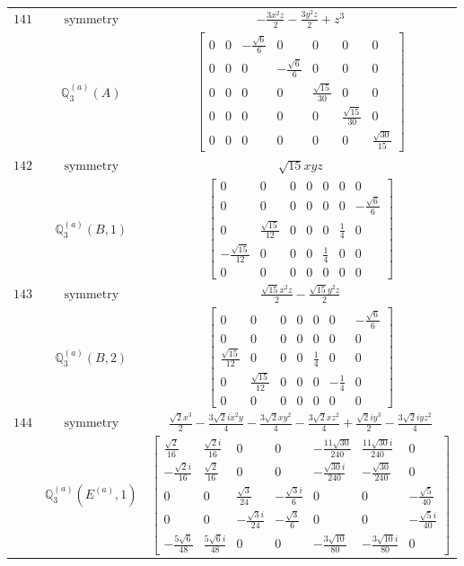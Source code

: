 \documentclass[fleqn,8pt,landscape]{jsarticle}
\begin{document}
\begin{longtable}{ccc}
$ 141 $ & $ \text{symmetry} $ & $ - \frac{3 x^{2} z}{2} - \frac{3 y^{2} z}{2} + z^{3} $ \\
$  $ & $ \mathbb{Q}_{3}^{(a)}(A) $ & $ \begin{bmatrix} 0 & 0 & - \frac{\sqrt{6}}{6} & 0 & 0 & 0 & 0 \\ 0 & 0 & 0 & - \frac{\sqrt{6}}{6} & 0 & 0 & 0 \\ 0 & 0 & 0 & 0 & \frac{\sqrt{15}}{30} & 0 & 0 \\ 0 & 0 & 0 & 0 & 0 & \frac{\sqrt{15}}{30} & 0 \\ 0 & 0 & 0 & 0 & 0 & 0 & \frac{\sqrt{30}}{15} \end{bmatrix} $ \\ \hline
$ 142 $ & $ \text{symmetry} $ & $ \sqrt{15} x y z $ \\
$  $ & $ \mathbb{Q}_{3}^{(a)}(B,1) $ & $ \begin{bmatrix} 0 & 0 & 0 & 0 & 0 & 0 & 0 \\ 0 & 0 & 0 & 0 & 0 & 0 & - \frac{\sqrt{6}}{6} \\ 0 & \frac{\sqrt{15}}{12} & 0 & 0 & 0 & \frac{1}{4} & 0 \\ - \frac{\sqrt{15}}{12} & 0 & 0 & 0 & \frac{1}{4} & 0 & 0 \\ 0 & 0 & 0 & 0 & 0 & 0 & 0 \end{bmatrix} $ \\ \hline
$ 143 $ & $ \text{symmetry} $ & $ \frac{\sqrt{15} x^{2} z}{2} - \frac{\sqrt{15} y^{2} z}{2} $ \\
$  $ & $ \mathbb{Q}_{3}^{(a)}(B,2) $ & $ \begin{bmatrix} 0 & 0 & 0 & 0 & 0 & 0 & - \frac{\sqrt{6}}{6} \\ 0 & 0 & 0 & 0 & 0 & 0 & 0 \\ \frac{\sqrt{15}}{12} & 0 & 0 & 0 & \frac{1}{4} & 0 & 0 \\ 0 & \frac{\sqrt{15}}{12} & 0 & 0 & 0 & - \frac{1}{4} & 0 \\ 0 & 0 & 0 & 0 & 0 & 0 & 0 \end{bmatrix} $ \\ \hline
$ 144 $ & $ \text{symmetry} $ & $ \frac{\sqrt{2} x^{3}}{2} - \frac{3 \sqrt{2} i x^{2} y}{4} - \frac{3 \sqrt{2} x y^{2}}{4} - \frac{3 \sqrt{2} x z^{2}}{4} + \frac{\sqrt{2} i y^{3}}{2} - \frac{3 \sqrt{2} i y z^{2}}{4} $ \\
$  $ & $ \mathbb{Q}_{3}^{(a)}(E^{(a)},1) $ & $ \begin{bmatrix} \frac{\sqrt{2}}{16} & \frac{\sqrt{2} i}{16} & 0 & 0 & - \frac{11 \sqrt{30}}{240} & \frac{11 \sqrt{30} i}{240} & 0 \\ - \frac{\sqrt{2} i}{16} & \frac{\sqrt{2}}{16} & 0 & 0 & - \frac{\sqrt{30} i}{240} & - \frac{\sqrt{30}}{240} & 0 \\ 0 & 0 & \frac{\sqrt{3}}{24} & - \frac{\sqrt{3} i}{6} & 0 & 0 & - \frac{\sqrt{5}}{40} \\ 0 & 0 & - \frac{\sqrt{3} i}{24} & - \frac{\sqrt{3}}{6} & 0 & 0 & - \frac{\sqrt{5} i}{40} \\ - \frac{5 \sqrt{6}}{48} & \frac{5 \sqrt{6} i}{48} & 0 & 0 & - \frac{3 \sqrt{10}}{80} & - \frac{3 \sqrt{10} i}{80} & 0 \end{bmatrix} $ \\ \hline

\end{longtable}
\end{document}
